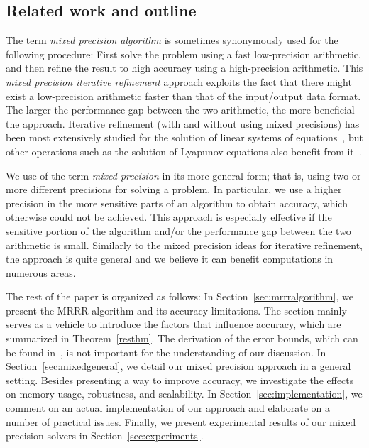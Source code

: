 \documentclass[final]{siamltex}
\begin{document}
\subsection{Related work and outline}
\label{sec:relatedwork}

The term {\it mixed precision algorithm} is sometimes synonymously
used for the following procedure: First solve the problem using a fast
low-precision arithmetic, and then refine the result to high accuracy using
a high-precision arithmetic.
This {\it mixed precision iterative refinement} approach
exploits the fact 
that  
there might exist a low-precision arithmetic faster
than that of the input/output data format. The larger the performance gap
between the two arithmetic, the more beneficial the
approach. Iterative refinement (with and without using mixed precisions) has
been most extensively studied for the 
solution of linear systems of equations~\cite{HIGHAM01101997},
but other 
operations such as the solution of Lyapunov equations   
also benefit from it~\cite{Benner:2011:MAS:2010586.2010622}.
 
We use of the term {\it mixed precision} in its more general form; that is,
using two or more different precisions for solving a problem. In particular,
we use a
higher precision in the more sensitive parts of an 
algorithm to obtain accuracy, which otherwise could not be achieved. This
approach is especially effective if the sensitive 
portion of the algorithm and/or the performance gap
between the two arithmetic is small. Similarly to the mixed
precision ideas for iterative refinement, the approach is quite
general and we believe it can benefit computations in numerous areas. 

The rest of the paper is organized as follows: In
Section~\ref{sec:mrrralgorithm}, we present the MRRR algorithm and its
accuracy limitations. The section mainly serves as a vehicle to introduce the
factors that influence accuracy, which are summarized in
Theorem~\ref{resthm}. The derivation of
the error bounds, which can be found in~\cite{Willems:framework}, is not important
for the understanding of our discussion. In
Section~\ref{sec:mixedgeneral}, we detail our mixed 
precision approach in a general setting. Besides presenting a way to improve
accuracy, we investigate the effects on memory
usage, robustness, and scalability.
In Section~\ref{sec:implementation}, we comment on an actual implementation
of our approach and 
elaborate on a number of practical issues. Finally, we present experimental
results of our mixed precision solvers in Section~\ref{sec:experiments}. 
\end{document}
